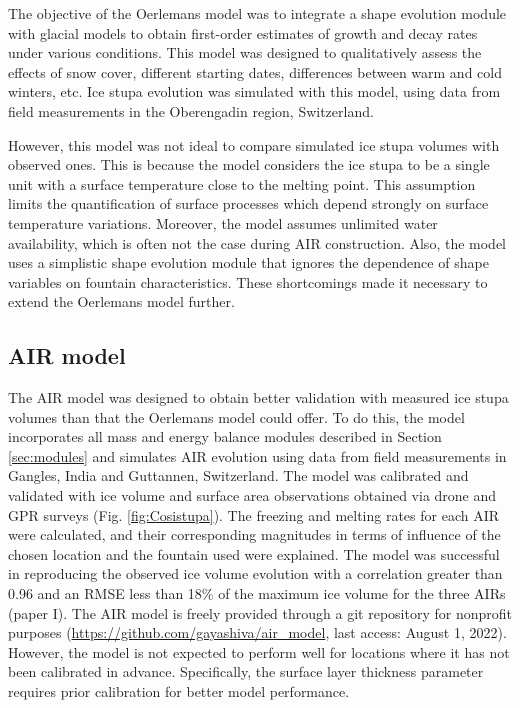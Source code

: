The objective of the Oerlemans model was to integrate a shape evolution module with glacial models to obtain
first-order estimates of growth and decay rates under various conditions. This model was designed to
qualitatively assess the effects of snow cover, different starting dates, differences between warm and cold
winters, etc. Ice stupa evolution was simulated with this model, using data from field measurements in the Oberengadin region, Switzerland. 

However, this model was not ideal to compare simulated ice stupa volumes with observed ones. This is
because the model considers the ice stupa to be a single unit with a surface temperature close to the melting
point. This assumption limits the quantification of surface processes which depend strongly on surface
temperature variations. Moreover, the model assumes unlimited water availability, which is often not the case
during \ac{AIR} construction. Also, the model uses a simplistic shape evolution module that ignores the dependence of
shape variables on fountain characteristics. These shortcomings made it necessary to extend the Oerlemans
model further.

\subsection{AIR model}

The \ac{AIR} model was designed to obtain better validation with measured ice stupa volumes than that the
Oerlemans model could offer. To do this, the model incorporates all mass and energy balance modules described in
Section \ref{sec:modules} and simulates \ac{AIR} evolution using data from field measurements in Gangles, India
and Guttannen, Switzerland. The model was calibrated and validated with ice volume and surface area observations
obtained via drone and \ac{GPR} surveys (Fig. \ref{fig:Cosistupa}). The freezing and melting rates for each
\ac{AIR} were calculated, and their corresponding magnitudes in terms of influence of the chosen location and
the fountain used were explained. The model was successful in reproducing the observed ice volume evolution with
a correlation greater than 0.96 and an \ac{RMSE} less than 18\% of the maximum ice volume for the three
\ac{AIRs} (paper I). The \ac{AIR} model is freely provided through a git repository for nonprofit purposes
(\url{https://github.com/gayashiva/air_model}, last access: August 1, 2022). However, the model is not expected
to perform well for locations where it has not been calibrated in advance. Specifically, the surface layer
thickness parameter requires prior calibration for better model performance.

